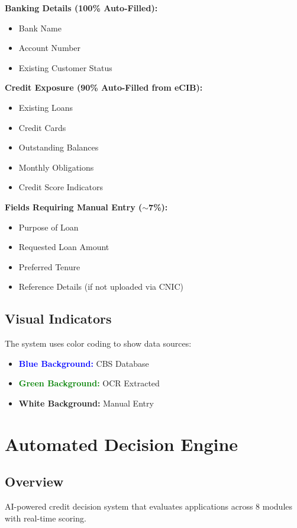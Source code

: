 \documentclass[12pt,a4paper]{article}
\begin{document}
\textbf{Banking Details (100\% Auto-Filled):}
\begin{itemize}[noitemsep]
    \item Bank Name
    \item Account Number
    \item Existing Customer Status
\end{itemize}

\textbf{Credit Exposure (90\% Auto-Filled from eCIB):}
\begin{itemize}[noitemsep]
    \item Existing Loans
    \item Credit Cards
    \item Outstanding Balances
    \item Monthly Obligations
    \item Credit Score Indicators
\end{itemize}

\textbf{Fields Requiring Manual Entry ($\sim$7\%):}
\begin{itemize}[noitemsep]
    \item Purpose of Loan
    \item Requested Loan Amount
    \item Preferred Tenure
    \item Reference Details (if not uploaded via CNIC)
\end{itemize}

\subsection{Visual Indicators}

The system uses color coding to show data sources:
\begin{itemize}
    \item \textcolor{blue}{\textbf{Blue Background:}} CBS Database
    \item \textcolor{green}{\textbf{Green Background:}} OCR Extracted
    \item \textbf{White Background:} Manual Entry
\end{itemize}

\newpage

\section{Automated Decision Engine}

\subsection{Overview}
AI-powered credit decision system that evaluates applications across 8 modules with real-time scoring.
\end{document}

